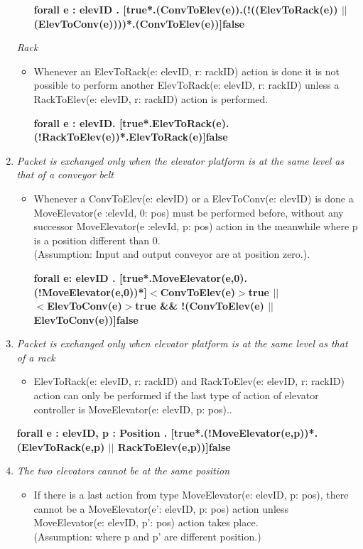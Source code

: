 \begin{enumerate}
\begin{itemize}
	\textbf{forall e : elevID . [true*.(ConvToElev(e)).(!((ElevToRack(e)) $||$ (ElevToConv(e))))*.(ConvToElev(e))]false
	}
	\end{itemize}
	
	\textit{Rack}
	\begin{itemize}
	\item Whenever an ElevToRack(e: elevID, r: rackID) action is done it is not possible to perform another ElevToRack(e: elevID, r: rackID) unless a RackToElev(e: elevID, r: rackID) action is performed.%
	
	\textbf{forall e : elevID. [true*.ElevToRack(e).(!RackToElev(e))*.ElevToRack(e)]false}
	\end{itemize}

\item \textit{ Packet is exchanged only when the elevator platform is at
the same level as that of a conveyor belt}
	\begin{itemize}
	\item Whenever a ConvToElev(e: elevID) or a ElevToConv(e: 
	elevID) is done a MoveElevator(e :elevId, 0: pos) must be
	performed before, without any successor MoveElevator(e :elevId, p: pos) action in the meanwhile where p is a position different than 0.\\(Assumption: Input and output conveyor are at
	position zero.).
	
	\textbf{forall e: elevID . [true*.MoveElevator(e,0).\\(!MoveElevator(e,0))*]$<$ConvToElev(e)$>$true $||$ \\$<$ElevToConv(e)$>$true \&\& !(ConvToElev(e) $||$ ElevToConv(e))]false}
	
	\end{itemize}

\item \textit{Packet is exchanged only when elevator platform is at the same level as that of a rack}
	\begin{itemize}
	\item ElevToRack(e: elevID, r: rackID) and RackToElev(e: elevID, r: rackID) action can only be performed if the last type of action of elevator controller is MoveElevator(e: elevID, p: pos)..
	\end{itemize}
	
	\textbf{forall e : elevID, p : Position . [true*.(!MoveElevator(e,p))*.(ElevToRack(e,p) $||$ RackToElev(e,p))]false}	
	
\item \textit{The two elevators cannot be at the same position}
	\begin{itemize}
	\item If there is a last action from type MoveElevator(e: elevID, p: pos),
	there cannot be a MoveElevator(e': elevID, p: pos) action unless 
	MoveElevator(e: elevID, p': pos) action takes place.\\(Assumption: where p and p' are different position.)
	

\end{itemize}
\end{enumerate}
